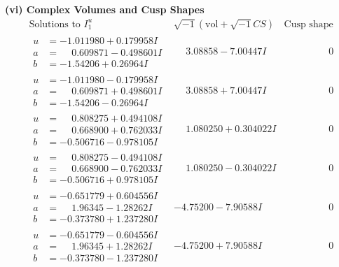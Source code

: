 \documentclass[1p]{elsarticle_modified}
\theoremstyle{definition}
\newcommand{\I}{\sqrt{-1}}
\begin{document}
\newpage\flushleft \textbf{(vi) Complex Volumes and Cusp Shapes}
$$\begin{array}{c|c|c}  
\text{Solutions to }I^u_{1}& \I (\text{vol} + \sqrt{-1}CS) & \text{Cusp shape}\\
 \hline 
\begin{aligned}
u &= -1.011980 + 0.179958 I \\
a &= \phantom{-}0.609871 - 0.498601 I \\
b &= -1.54206 + 0.26964 I\end{aligned}
 & \phantom{-}3.08858 - 7.00447 I & \phantom{-0.000000 } 0 \\ \hline\begin{aligned}
u &= -1.011980 - 0.179958 I \\
a &= \phantom{-}0.609871 + 0.498601 I \\
b &= -1.54206 - 0.26964 I\end{aligned}
 & \phantom{-}3.08858 + 7.00447 I & \phantom{-0.000000 } 0 \\ \hline\begin{aligned}
u &= \phantom{-}0.808275 + 0.494108 I \\
a &= \phantom{-}0.668900 + 0.762033 I \\
b &= -0.506716 - 0.978105 I\end{aligned}
 & \phantom{-}1.080250 + 0.304022 I & \phantom{-0.000000 } 0 \\ \hline\begin{aligned}
u &= \phantom{-}0.808275 - 0.494108 I \\
a &= \phantom{-}0.668900 - 0.762033 I \\
b &= -0.506716 + 0.978105 I\end{aligned}
 & \phantom{-}1.080250 - 0.304022 I & \phantom{-0.000000 } 0 \\ \hline\begin{aligned}
u &= -0.651779 + 0.604556 I \\
a &= \phantom{-}1.96345 - 1.28262 I \\
b &= -0.373780 + 1.237280 I\end{aligned}
 & -4.75200 - 7.90588 I & \phantom{-0.000000 } 0 \\ \hline\begin{aligned}
u &= -0.651779 - 0.604556 I \\
a &= \phantom{-}1.96345 + 1.28262 I \\
b &= -0.373780 - 1.237280 I\end{aligned}
 & -4.75200 + 7.90588 I & \phantom{-0.000000 } 0 \\ \hline\begin{aligned}

\end{aligned}
\end{array}$$
\end{document}
